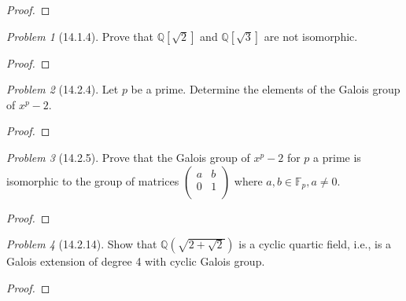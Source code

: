 \documentclass[10pt]{article}
\newcommand{\sk}{\vskip 10mm}
\newcommand{\bb}[1]{\mathbb{#1}}
\theoremstyle{remark}
\newtheorem{problem}{Problem}
\theoremstyle{remark}
\begin{document}
\begin{proof}
  
\end{proof}

\sk

\begin{problem}[14.1.4]
  Prove that $\bb{Q}[\sqrt{2}]$ and $\bb{Q}[\sqrt{3}]$ are not isomorphic.
\end{problem}

\begin{proof}
  
\end{proof}

\sk

\begin{problem}[14.2.4]
  Let $p$ be a prime. Determine the elements of the Galois group of $x^p-2$.
\end{problem}

\begin{proof}
  
\end{proof}

\sk

\begin{problem}[14.2.5]
  Prove that the Galois group of $x^p-2$ for $p$ a prime is isomorphic to
  the group of matrices $\left(\begin{array}{cc}a&b\\0&1\\ \end{array}\right)$
  where $a,b\in\bb{F}_p,a\neq 0$.
\end{problem}

\begin{proof}
  
\end{proof}

\sk

\begin{problem}[14.2.14]
  Show that $\bb{Q}(\sqrt{2+\sqrt{2}})$ is a cyclic quartic field,
  i.e., is a Galois extension of degree 4 with cyclic Galois group.
\end{problem}

\begin{proof}
  
\end{proof}

\sk

\end{document}
